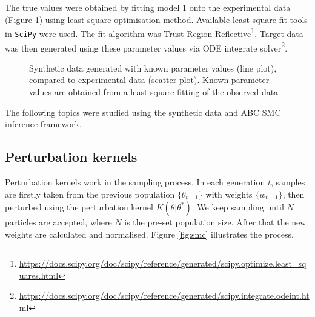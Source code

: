 The true values were obtained by fitting model 1 onto the experimental data (Figure \ref{fig:infer_back_data}) using least-square optimisation method. Available least-square fit tools in \verb|SciPy| were used. The fit algorithm was Trust Region Reflective\footnote{\url{https://docs.scipy.org/doc/scipy/reference/generated/scipy.optimize.least_squares.html}}. Target data was then generated using these parameter values via ODE integrate solver\footnote{\url{https://docs.scipy.org/doc/scipy/reference/generated/scipy.integrate.odeint.html}}.


\begin{figure}[ht]
    \begin{center}
    \end{center}

    \caption[Synthetic data generated with known parameter values]%
    {Synthetic data generated with known parameter values (line plot), compared to experimental data (scatter plot). Known parameter values are obtained from a least square fitting of the observed data}
    \label{fig:infer_back_data}

\end{figure}


The following topics were studied using the synthetic data and ABC SMC inference framework.

\subsection{Perturbation kernels}

Perturbation kernels work in the sampling process. In each generation $t$, samples are firstly taken from the previous population $\{\theta_{t-1}\}$ with weights $\{w_{t-1}\}$, then perturbed using the perturbation kernel $K(\theta|\theta^*)$. We keep sampling until $N$ particles are accepted, where $N$ is the pre-set population size. After that the new weights are calculated and normalised. Figure \ref{fig:smc} illustrates the process.

